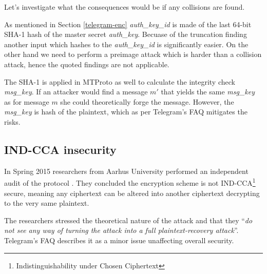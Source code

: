 \documentclass[thesis=M,english]{FITthesis}[2012/10/20]
\begin{document}
Let's investigate what the consequences would be if any collisions are found.

As mentioned in Section \ref{telegram-enc} \emph{auth\_key\_id} is made of the last 64-bit SHA-1 hash of the master secret \emph{auth\_key}. Becuase of the truncation finding another input which hashes to the \emph{auth\_key\_id} is significantly easier. On the other hand we need to perform a preimage attack which is harder than a collision attack, hence the quoted findings are not applicable.

The SHA-1 is applied in MTProto as well to calculate the integrity check \emph{msg\_key}. If an attacker would find a message $m'$ that yields the same \emph{msg\_key} as for message $m$ she could theoretically forge the message. However, the \emph{msg\_key} is hash of the plaintext, which as per Telegram's FAQ \cite{telegram-techfaq} mitigates the risks.

\subsection{IND-CCA insecurity}

In Spring 2015 researchers from Aarhus University performed an independent audit of the protocol \cite{telegram-aarhus}. They concluded the encryption scheme is not IND-CCA\footnote{Indistinguishability under Chosen Ciphertext} secure, meaning any ciphertext can be altered into another ciphertext decrypting to the very same plaintext.

The researchers stressed the theoretical nature of the attack and that they ``\emph{do not see any way of turning the attack into a full plaintext-recovery attack}''\cite{telegram-aarhus}. Telegram's FAQ describes it as a minor issue unaffecting overall security. \cite{telegram-techfaq}
\end{document}
